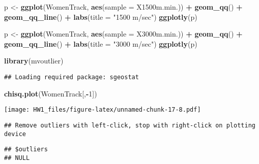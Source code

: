 \documentclass[
]{article}
\newenvironment{Shaded}{\begin{snugshade}}{\end{snugshade}}
\newcommand{\DataTypeTok}[1]{\textcolor[rgb]{0.13,0.29,0.53}{#1}}
\newcommand{\DecValTok}[1]{\textcolor[rgb]{0.00,0.00,0.81}{#1}}
\newcommand{\KeywordTok}[1]{\textcolor[rgb]{0.13,0.29,0.53}{\textbf{#1}}}
\newcommand{\NormalTok}[1]{#1}
\newcommand{\OperatorTok}[1]{\textcolor[rgb]{0.81,0.36,0.00}{\textbf{#1}}}
\newcommand{\StringTok}[1]{\textcolor[rgb]{0.31,0.60,0.02}{#1}}
\begin{document}
\begin{Shaded}
\begin{Highlighting}[]
\NormalTok{p <-}\StringTok{ }\KeywordTok{ggplot}\NormalTok{(WomenTrack, }\KeywordTok{aes}\NormalTok{(}\DataTypeTok{sample =}\NormalTok{ X1500m.min.)) }\OperatorTok{+}\StringTok{ }\KeywordTok{geom_qq}\NormalTok{() }\OperatorTok{+}\StringTok{ }\KeywordTok{geom_qq_line}\NormalTok{() }\OperatorTok{+}\StringTok{ }\KeywordTok{labs}\NormalTok{(}\DataTypeTok{title =} \StringTok{"1500 m/sec"}\NormalTok{)}
\KeywordTok{ggplotly}\NormalTok{(p)}
\end{Highlighting}
\end{Shaded}

\begin{Shaded}
\begin{Highlighting}[]
\NormalTok{p <-}\StringTok{ }\KeywordTok{ggplot}\NormalTok{(WomenTrack, }\KeywordTok{aes}\NormalTok{(}\DataTypeTok{sample =}\NormalTok{ X3000m.min.)) }\OperatorTok{+}\StringTok{ }\KeywordTok{geom_qq}\NormalTok{() }\OperatorTok{+}\StringTok{ }\KeywordTok{geom_qq_line}\NormalTok{() }\OperatorTok{+}\StringTok{ }\KeywordTok{labs}\NormalTok{(}\DataTypeTok{title =} \StringTok{"3000 m/sec"}\NormalTok{)}
\KeywordTok{ggplotly}\NormalTok{(p)}
\end{Highlighting}
\end{Shaded}

\begin{Shaded}
\begin{Highlighting}[]
\KeywordTok{library}\NormalTok{(mvoutlier)}
\end{Highlighting}
\end{Shaded}

\begin{verbatim}
## Loading required package: sgeostat
\end{verbatim}

\begin{Shaded}
\begin{Highlighting}[]
\KeywordTok{chisq.plot}\NormalTok{(WomenTrack[,}\OperatorTok{-}\DecValTok{1}\NormalTok{])}
\end{Highlighting}
\end{Shaded}

\texttt{[image: HW1\_files/figure-latex/unnamed-chunk-17-8.pdf]}

\begin{verbatim}
## Remove outliers with left-click, stop with right-click on plotting device
\end{verbatim}

\begin{verbatim}
## $outliers
## NULL
\end{verbatim}
\end{document}
